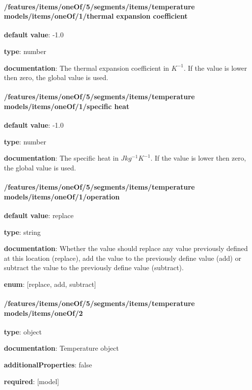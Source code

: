 \begin{itemized}
\end{itemized}\paragraph{/features/items/oneOf/5/segments/items/temperature models/items/oneOf/1/thermal expansion coefficient} \begin{itemized}
\item {\bf default value}: -1.0
\item {\bf type}: number
\item {\bf documentation}: The thermal expansion coefficient in $K^{-1}$. If the value is lower then zero, the global value is used.
\end{itemized}\paragraph{/features/items/oneOf/5/segments/items/temperature models/items/oneOf/1/specific heat} \begin{itemized}
\item {\bf default value}: -1.0
\item {\bf type}: number
\item {\bf documentation}: The specific heat in $J kg^{-1} K^{-1}$. If the value is lower then zero, the global value is used.
\end{itemized}\paragraph{/features/items/oneOf/5/segments/items/temperature models/items/oneOf/1/operation} \begin{itemized}
\item {\bf default value}: replace
\item {\bf type}: string
\item {\bf documentation}: Whether the value should replace any value previously defined at this location (replace), add the value to the previously define value (add) or subtract the value to the previously define value (subtract).
\item {\bf enum}: [replace, add, subtract]\end{itemized}\paragraph{/features/items/oneOf/5/segments/items/temperature models/items/oneOf/2} \begin{itemized}
\item {\bf type}: object
\item {\bf documentation}: Temperature object
\item {\bf additionalProperties}: false
\item {\bf required}: [model]\end{itemized}
